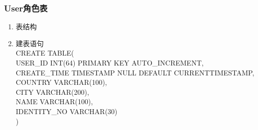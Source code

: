 \subsubsection{User角色表}
\begin{enumerate}
    \item 表结构
    \begin{table}[htbp]
        \centering
        \end{table}
    \item 建表语句\\
        CREATE TABLE(\\
            USER\_ID INT(64) PRIMARY KEY AUTO\_INCREMENT,\\
            CREATE\_TIME TIMESTAMP NULL DEFAULT CURRENTTIMESTAMP,\\
            COUNTRY VARCHAR(100),\\
            CITY VARCHAR(200),\\
            NAME VARCHAR(100),\\
            IDENTITY\_NO VARCHAR(30) \\
        )
    \end{enumerate}

